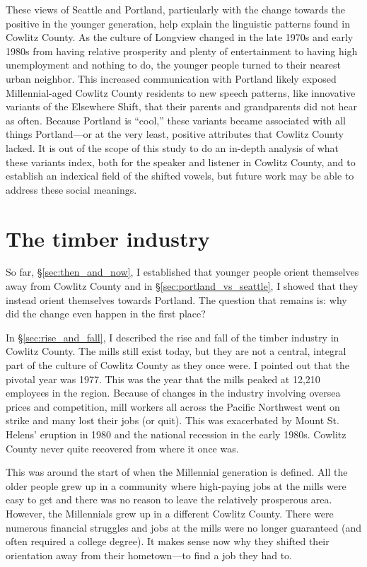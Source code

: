These views of Seattle and Portland, particularly with the change towards the positive in the younger generation, help explain the linguistic patterns found in Cowlitz County. As the culture of Longview changed in the late 1970s and early 1980s from having relative prosperity and plenty of entertainment to having high unemployment and nothing to do, the younger people turned to their nearest urban neighbor. This increased communication with Portland likely exposed Millennial-aged Cowlitz County residents to new speech patterns, like innovative variants of the Elsewhere Shift, that their parents and grandparents did not hear as often. Because Portland is ``cool,'' these variants became associated with all things Portland---or at the very least, positive attributes that Cowlitz County lacked. It is out of the scope of this study to do an in-depth analysis of what these variants index, both for the speaker and listener in Cowlitz County, and to establish an indexical field of the shifted vowels, but future work may be able to address these social meanings.



\section{The timber industry}

So far, \S\ref{sec:then_and_now}, I established that younger people orient themselves away from Cowlitz County and in \S\ref{sec:portland_vs_seattle}, I showed that they instead orient themselves towards Portland. The question that remains is: why did the change even happen in the first place?

In \S\ref{sec:rise_and_fall}, I described the rise and fall of the timber industry in Cowlitz County. The mills still exist today, but they are not a central, integral part of the culture of Cowlitz County as they once were. I pointed out that the pivotal year was 1977. This was the year that the mills peaked at 12,210 employees in the region. Because of changes in the industry involving oversea prices and competition, mill workers all across the Pacific Northwest went on strike and many lost their jobs (or quit). This was exacerbated by Mount St. Helens' eruption in 1980 and the national recession in the early 1980s. Cowlitz County never quite recovered from where it once was.

This was around the start of when the Millennial generation is defined. All the older people grew up in a community where high-paying jobs at the mills were easy to get and there was no reason to leave the relatively prosperous area. However, the Millennials grew up in a different Cowlitz County. There were numerous financial struggles and jobs at the mills were no longer guaranteed (and often required a college degree). It makes sense now why they shifted their orientation away from their hometown---to find a job they had to.

